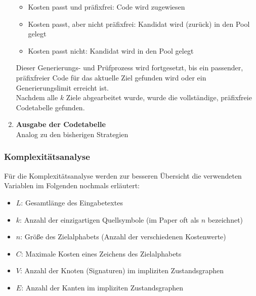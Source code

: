 \documentclass[a4paper,10pt,ngerman]{scrartcl}
\begin{document}
\begin{enumerate}
  \begin{itemize}
    \item Kosten passt und präfixfrei: Code wird zugewiesen 
    \item Kosten passt, aber nicht präfixfrei: Kandidat wird (zurück) in den Pool gelegt 
    \item Kosten passt nicht: Kandidat wird in den Pool gelegt 
  \end{itemize}
  Dieser Generierungs- und Prüfprozess wird fortgesetzt, bis ein passender, präfixfreier Code für das aktuelle Ziel gefunden wird oder ein Generierungslimit erreicht ist. 
  \\\newline
  Nachdem alle $k$ Ziele abgearbeitet wurde, wurde die vollständige, präfixfreie Codetabelle gefunden. 
  \item \textbf{Ausgabe der Codetabelle} \\
  Analog zu den bisherigen Strategien
  
\end{enumerate}

\subsubsection{Komplexitätsanalyse}
Für die Komplexitätsanalyse werden zur besseren Übersicht die verwendeten Variablen im Folgenden nochmals erläutert:
\begin{itemize}
  \item $L$: Gesamtlänge des Eingabetextes
  \item $k$: Anzahl der einzigartigen Quellsymbole (im Paper oft als $n$ bezeichnet)
  \item $n$: Größe des Zielalphabets (Anzahl der verschiedenen Kostenwerte)
  \item $C$: Maximale Kosten eines Zeichens des Zielalphabets
  \item $V$: Anzahl der Knoten (Signaturen) im impliziten Zustandsgraphen
  \item $E$: Anzahl der Kanten im impliziten Zustandsgraphen
\end{itemize}

\vspace{0.2cm}
\end{document}
